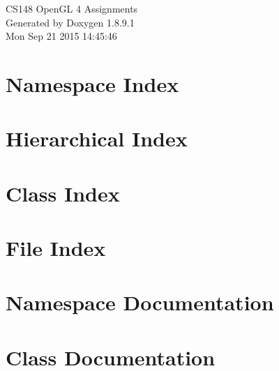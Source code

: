 \documentclass[twoside]{book}
\newcommand{\+}{\discretionary{\mbox{\scriptsize$\hookleftarrow$}}{}{}}
\newcommand{\clearemptydoublepage}{%
  \newpage{\pagestyle{empty}\cleardoublepage}%
}
\begin{document}
\hypersetup{pageanchor=false,
             bookmarks=true,
             bookmarksnumbered=true,
             pdfencoding=unicode
            }
\begin{titlepage}
\vspace*{7cm}
\begin{center}%
{\Large C\+S148 Open\+G\+L 4 Assignments }\\
\vspace*{1cm}
{\large Generated by Doxygen 1.8.9.1}\\
\vspace*{0.5cm}
{\small Mon Sep 21 2015 14:45:46}\\
\end{center}
\end{titlepage}
\clearemptydoublepage
\tableofcontents
\clearemptydoublepage
{}
\hypersetup{pageanchor=true}

\chapter{Namespace Index}

\chapter{Hierarchical Index}

\chapter{Class Index}

\chapter{File Index}

\chapter{Namespace Documentation}



\chapter{Class Documentation}



















\end{document}

